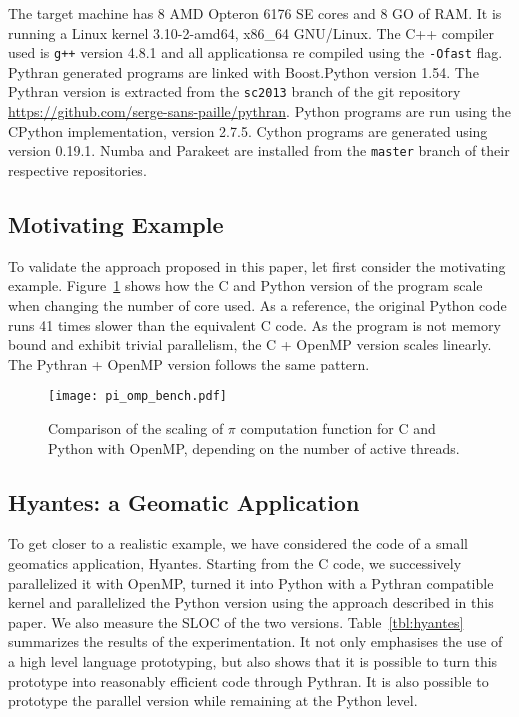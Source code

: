 \documentclass[conference]{IEEEtran}
\begin{document}
The target machine has  8 AMD Opteron 6176 SE cores and 8 GO of RAM. It is
running a Linux kernel 3.10-2-amd64, x86\_64 GNU/Linux. The C++ compiler used is
\texttt{g++} version 4.8.1 and all applicationsa re compiled using the
\texttt{-Ofast} flag. Pythran generated programs are linked with Boost.Python
version 1.54. The Pythran version is extracted from the \texttt{sc2013} branch
of the git repository \url{https://github.com/serge-sans-paille/pythran}. Python
programs are run using the CPython implementation, version 2.7.5. Cython
programs are generated using version 0.19.1. Numba and Parakeet are installed
from the \texttt{master} branch of their respective repositories.

\subsection{Motivating Example}

To validate the approach proposed in this paper, let first consider the
motivating example. Figure~\ref{fig:motivating-example-scale} shows how the C
and Python version of the program scale when changing the number of core used.
As a reference, the original Python code runs 41 times slower than the
equivalent C code. As the program is not memory bound and exhibit trivial
parallelism, the C + OpenMP version scales linearly. The Pythran + OpenMP
version follows the same pattern.

\begin{figure}

    \caption{Comparison of the scaling of $\pi$ computation function for C and
    Python with OpenMP, depending on the number of active threads.}
    \label{fig:motivating-example-scale}

    \texttt{[image: pi\_omp\_bench.pdf]}

\end{figure}


\subsection{Hyantes: a Geomatic Application}

To get closer to a realistic example, we have considered the code of a small
geomatics application, Hyantes. Starting from the C code, we successively
parallelized it with OpenMP, turned it into Python with a Pythran compatible
kernel and parallelized the Python version using the approach described in this
paper. We also measure the SLOC of the two versions.  Table~\ref{tbl:hyantes}
summarizes the results of the experimentation. It not only emphasises the
use of a high level language prototyping, but also shows that it is possible to
turn this prototype into reasonably efficient code through Pythran. It is also
possible to prototype the parallel version while remaining at the Python level.
\end{document}
